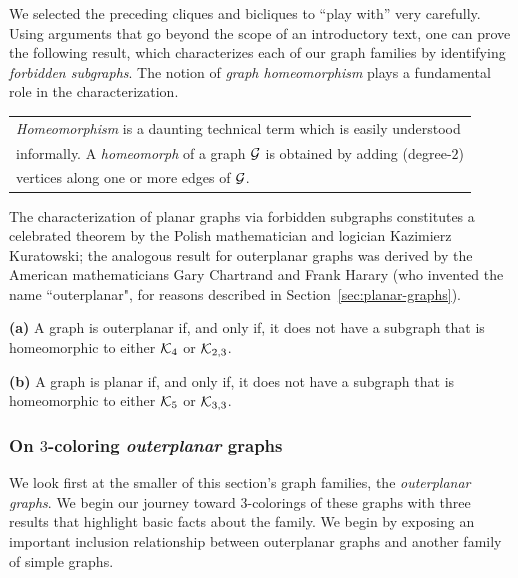 We selected the preceding cliques and bicliques to ``play with'' very carefully.  Using arguments that go beyond the scope of an introductory text, one can prove the following result, which characterizes each of our graph families by identifying {\it forbidden subgraphs}.   The notion of {\it graph homeomorphism} plays a fundamental role in the characterization.

\smallskip

\begin{tabular}{l}
{\it Homeomorphism} is a daunting technical term which is easily understood \\
informally.  A {\it homeomorph} of a graph $\mbox{$\cal G$}$ is obtained by adding (degree-$2$) \\
vertices along one or more edges of $\mbox{$\cal G$}$.
\end{tabular}

\smallskip


\noindent
The characterization of planar graphs via forbidden subgraphs constitutes a celebrated theorem by the Polish mathematician and logician Kazimierz Kuratowski; the analogous result for outerplanar graphs was derived by the American mathematicians Gary Chartrand and Frank Harary (who invented the name ``outerplanar", for reasons described in Section~\ref{sec:planar-graphs}).

  
 
\begin{theorem}
\label{thm:planar+outerplanar-exclusion}
{\bf (a)} {\rm \cite{ChartrandB67}}
A graph is outerplanar if, and only if, it does not have a subgraph that is homeomorphic to either $\mbox{$\cal K$}_4$ or $\mbox{$\cal K$}_{2,3}$.

\smallskip

\noindent
{\bf (b)} {\rm \cite{Kuratowski30}}
A graph is planar if, and only if, it does not have a subgraph that is homeomorphic to either $\mbox{$\cal K$}_5$ or $\mbox{$\cal K$}_{3,3}$.
\end{theorem}


\subsubsection{On $3$-coloring {\em outerplanar} graphs}

We look first at the smaller of this section's graph families, the {\it outerplanar graphs}.   We begin our journey toward $3$-colorings of these graphs with three results that highlight basic facts about the family.  We begin by exposing an important inclusion relationship between outerplanar graphs and another family of simple graphs.

